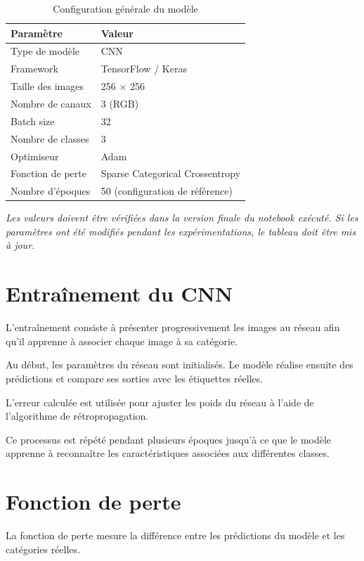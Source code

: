 \documentclass[12pt,a4paper,oneside]{report}
\begin{document}
\begin{table}[H]
\centering
\caption{Configuration générale du modèle}
\begin{tabular}{ll}
\toprule
\textbf{Paramètre} & \textbf{Valeur}\\
\midrule
Type de modèle & CNN\\
Framework & TensorFlow / Keras\\
Taille des images & 256 $\times$ 256\\
Nombre de canaux & 3 (RGB)\\
Batch size & 32\\
Nombre de classes & 3\\
Optimiseur & Adam\\
Fonction de perte & Sparse Categorical Crossentropy\\
Nombre d'époques & 50 (configuration de référence)\\
\bottomrule
\end{tabular}
\end{table}

\textit{Les valeurs doivent être vérifiées dans la version
finale du notebook exécuté. Si les paramètres ont été
modifiés pendant les expérimentations, le tableau doit
être mis à jour.}

\section{Entraînement du CNN}

L'entraînement consiste à présenter progressivement
les images au réseau afin qu'il apprenne à associer
chaque image à sa catégorie.

Au début, les paramètres du réseau sont initialisés.
Le modèle réalise ensuite des prédictions et compare
ses sorties avec les étiquettes réelles.

L'erreur calculée est utilisée pour ajuster les poids
du réseau à l'aide de l'algorithme de rétropropagation.

Ce processus est répété pendant plusieurs époques
jusqu'à ce que le modèle apprenne à reconnaître
les caractéristiques associées aux différentes classes.

\section{Fonction de perte}

La fonction de perte mesure la différence entre les
prédictions du modèle et les catégories réelles.
\end{document}
